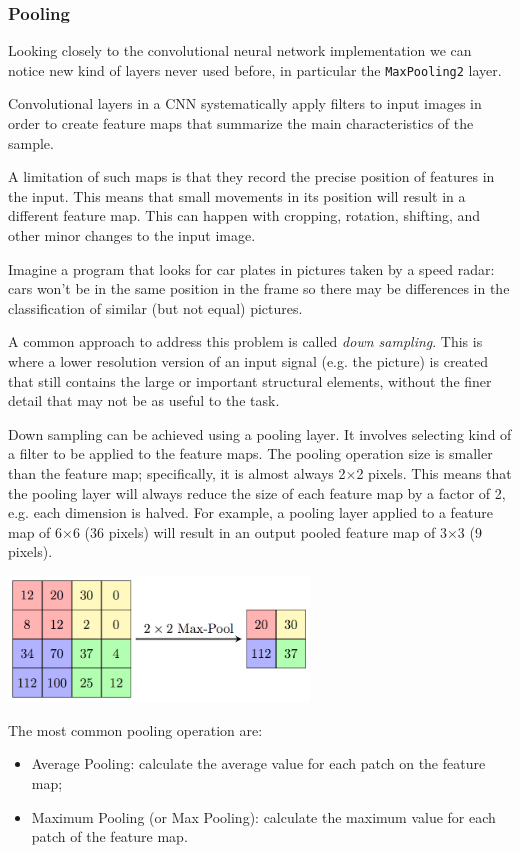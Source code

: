 \begin{attention}
\subsubsection{Pooling}

Looking closely to the convolutional neural network implementation we can notice new kind of layers never used before, in particular the \texttt{MaxPooling2} layer.

Convolutional layers in a CNN systematically apply filters to input images in order to create feature maps that summarize the main characteristics of the sample.

A limitation of such maps is that they record the precise position of features in the input. This means that small movements in its position will result in a different feature map. This can happen with cropping, rotation, shifting, and other minor changes to the input image.

Imagine a program that looks for car plates in pictures taken by a speed radar: cars won't be in the same position in the frame so there may be differences in the classification of similar (but not equal) pictures.

A common approach to address this problem is called \emph{down sampling}. 
This is where a lower resolution version of an input signal (e.g. the picture) is created that still contains the large or important structural elements, without the finer detail that may not be as useful to the task.

Down sampling can be achieved using a pooling layer.
It involves selecting kind of a filter to be applied to the feature maps. The pooling operation size is smaller than the feature map; specifically, it is almost always 2×2 pixels. This means that the pooling layer will always reduce the size of each feature map by a factor of 2, e.g. each dimension is halved. For example, a pooling layer applied to a feature map of 6×6 (36 pixels) will result in an output pooled feature map of 3×3 (9 pixels).

\begin{center}
\includegraphics[width=0.6\textwidth]{figures/MaxpoolSample2}
\end{center}

The most common pooling operation are:
\begin{itemize}
\tightlist
\item Average Pooling: calculate the average value for each patch on the feature map;
\item Maximum Pooling (or Max Pooling): calculate the maximum value for each patch of the feature map.
\end{itemize}
\end{attention}

